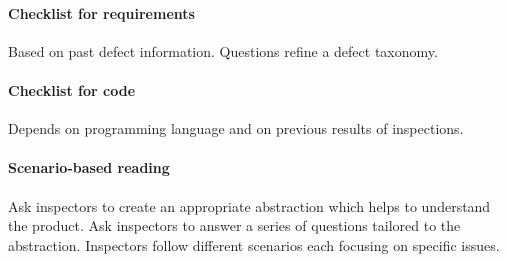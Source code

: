 \begin{Parallel}{0.45\textwidth}{0.45\textwidth}
\end{Parallel}

\paragraph{Checklist for requirements}
Based on past defect information. Questions refine a defect taxonomy.

\paragraph{Checklist for code}
Depends on programming language and on previous results of inspections.

\paragraph{Scenario-based reading}
Ask inspectors to create an appropriate abstraction which helps to understand the product. Ask inspectors to answer a series of questions tailored to the abstraction. Inspectors follow different scenarios each focusing on specific issues.

